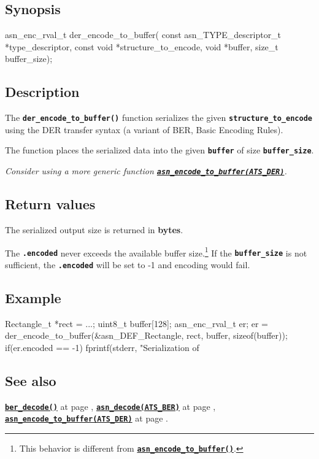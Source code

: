 \documentclass[english,oneside,12pt]{book}
\newcommand{\api}[2]{\hyperref[#1]{\code{#2}}}
\newcommand{\seealso}[2]{\api{#1}{#2} at page \pageref{#1}}
\newcommand{\code}[1]{\texttt{\textbf{\lstinline{#1}}}}
\begin{document}
\subsection*{Synopsis}

\begin{signature}
asn_enc_rval_t der_encode_to_buffer(
    const asn_TYPE_descriptor_t *type_descriptor,
    const void *structure_to_encode,
    void *buffer, size_t buffer_size);
\end{signature}

\subsection*{Description}

The \code{der_encode_to_buffer()} function serializes the given \code{structure_to_encode} using the DER transfer syntax (a variant of BER, Basic Encoding Rules).

The function places the serialized data into the given
\code{buffer} of size \code{buffer_size}.\newline

\noindent\emph{Consider using a more generic function \api{sec:asn_encode_to_buffer}{asn_encode_to_buffer(ATS_DER)}.}

\subsection*{Return values}


The serialized output size is returned in \textbf{bytes}.

The \code{.encoded} never exceeds the available buffer size.\footnote{This
behavior is different from \api{sec:asn_encode_to_buffer}{asn_encode_to_buffer()}.}
If the \code{buffer_size} is not sufficient, the \code{.encoded}
will be set to -1 and encoding would fail.

\subsection*{Example}
\begin{example}
Rectangle_t *rect = ...;
uint8_t buffer[128];
asn_enc_rval_t er;
er = der_encode_to_buffer(&asn_DEF_Rectangle, rect, buffer, sizeof(buffer));
if(er.encoded == -1) {
   fprintf(stderr, "Serialization of %
}
\end{example}

\subsection*{See also}
\seealso{sec:ber_decode}{ber_decode()},
\seealso{sec:asn_decode}{asn_decode(ATS_BER)},
\seealso{sec:asn_encode_to_buffer}{asn_encode_to_buffer(ATS_DER)}.
\end{document}
